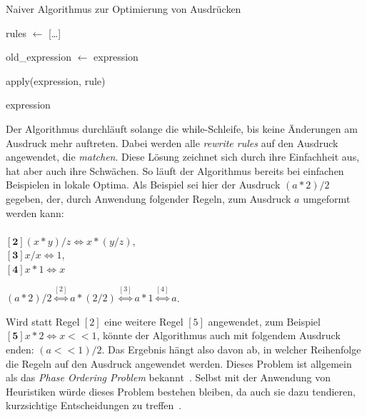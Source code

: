 
\begin{algorithm}[H]
  \caption{Naiver Algorithmus zur Optimierung von Ausdrücken}\label{alg:ausdruck1}
  \begin{algorithmic}
    \State rules $\gets$ [\ldots]
    
      \State old\_expression $\gets$ expression

        \State apply(expression, rule)
        \EndIf
      \EndFor
    \EndWhile

    \State \Return expression
    \EndFunction
  \end{algorithmic}
\end{algorithm}

Der Algorithmus durchläuft solange die while-Schleife, bis keine Änderungen am Ausdruck mehr auftreten.
Dabei werden alle \textit{rewrite rules} auf den Ausdruck angewendet, die \textit{matchen}.
Diese Lösung zeichnet sich durch ihre Einfachheit aus, hat aber auch ihre Schwächen. So läuft der Algorithmus
bereits bei einfachen Beispielen in lokale Optima.
Als Beispiel sei hier der Ausdruck $(a * 2) / 2$ gegeben, der, durch Anwendung folgender Regeln, zum Ausdruck $a$ umgeformt werden kann: \\ \\
$[\mathbf{2}] (x * y) / z \Leftrightarrow x * (y / z)$, \\
$[\mathbf{3}] x / x \Leftrightarrow 1$, \\
$[\mathbf{4}] x * 1 \Leftrightarrow x$ 

$(a * 2) / 2 \overset{[2]}{\Leftrightarrow} a * (2 / 2) \overset{[3]}{\Leftrightarrow} a * 1 \overset{[4]}{\Leftrightarrow} a$.

Wird statt Regel $[2]$ eine weitere Regel $[5]$ angewendet, zum Beispiel $[\mathbf{5}] x * 2 \Leftrightarrow x << 1$, könnte der Algorithmus auch mit folgendem Ausdruck enden: $(a << 1) / 2$.
Das Ergebnis hängt also davon ab, in welcher Reihenfolge die Regeln auf den Ausdruck angewendet werden. 
Dieses Problem ist allgemein als das \textit{Phase Ordering Problem} bekannt~\cite{phaseorder-2009}.
Selbst mit der Anwendung von Heuristiken würde dieses Problem bestehen bleiben, da auch sie dazu tendieren, kurzsichtige Entscheidungen zu treffen~\cite{phaseorder-2009}.

